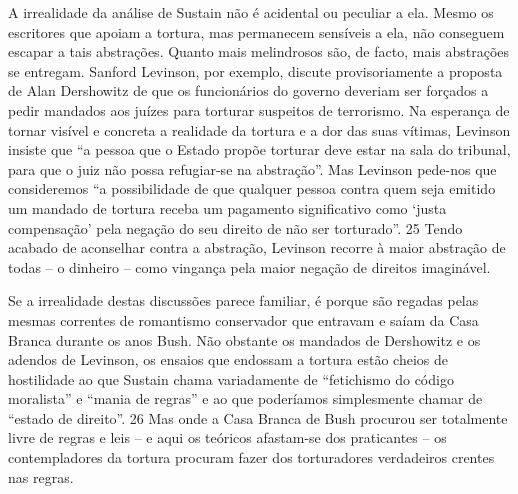 A irrealidade da análise de Sustain não é acidental ou peculiar a ela. Mesmo os escritores que apoiam a tortura, mas permanecem sensíveis a ela, não conseguem escapar a tais abstrações. Quanto mais melindrosos são, de facto, mais abstrações se entregam. Sanford Levinson, por exemplo, discute provisoriamente a proposta de Alan Dershowitz de que os funcionários do governo deveriam ser forçados a pedir mandados aos juízes para torturar suspeitos de terrorismo. Na esperança de tornar visível e concreta a realidade da tortura e a dor das suas vítimas, Levinson insiste que “a pessoa que o Estado propõe torturar deve estar na sala do tribunal, para que o juiz não possa refugiar-se na abstração”. Mas Levinson pede-nos que consideremos “a possibilidade de que qualquer pessoa contra quem seja emitido um mandado de tortura receba um pagamento significativo como ‘justa compensação’ pela negação do seu direito de não ser torturado”.
 {\color{blue} 25}  
Tendo acabado de aconselhar contra a abstração, Levinson recorre à maior abstração de todas – o dinheiro – como vingança pela maior negação de direitos imaginável.
 
\par
 
Se a irrealidade destas discussões parece familiar, é porque são regadas pelas mesmas correntes de romantismo conservador que entravam e saíam da Casa Branca durante os anos Bush. Não obstante os mandados de Dershowitz e os adendos de Levinson, os ensaios que endossam a tortura estão cheios de hostilidade ao que Sustain chama variadamente de “fetichismo do código moralista” e “mania de regras” e ao que poderíamos simplesmente chamar de “estado de direito”.
 {\color{blue} 26}  
Mas onde a Casa Branca de Bush procurou ser totalmente livre de regras e leis – e aqui os teóricos afastam-se dos praticantes – os contempladores da tortura procuram fazer dos torturadores verdadeiros crentes nas regras.
 
\par
 
